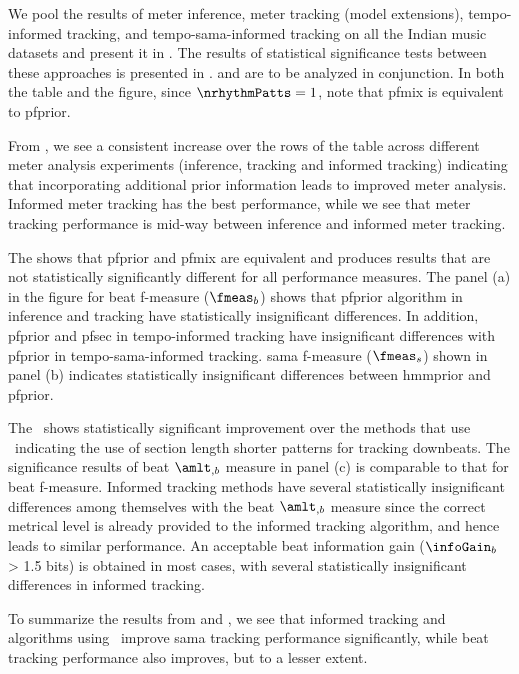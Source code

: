 We pool the results of meter inference, meter tracking (model extensions), tempo-informed tracking, and tempo-sama-informed tracking on all the Indian music datasets and present it in . The results of statistical significance tests between these approaches is presented in .  and  are to be analyzed in conjunction. In both the table and the figure, since $\nrhythmPatts=1$, note that \acrshort{pfmix} is equivalent to \acrshort{pfprior}. 

From , we see a consistent increase over the rows of the table across different meter analysis experiments (inference, tracking and informed tracking) indicating that incorporating additional prior information leads to improved meter analysis. Informed meter tracking has the best performance, while we see that meter tracking performance is mid-way between inference and informed meter tracking. 

The  shows that \acrshort{pfprior} and \acrshort{pfmix} are equivalent and produces results that are not statistically significantly different for all performance measures. The panel (a) in the figure for beat f-measure ($\fmeas_b$) shows that \acrshort{pfprior} algorithm in inference and tracking have statistically insignificant differences. In addition, \acrshort{pfprior} and \acrshort{pfsec} in tempo-informed tracking have insignificant differences with \acrshort{pfprior} in tempo-\gls{sama}-informed tracking. \Gls{sama} f-measure ($\fmeas_s$) shown in panel (b) indicates statistically insignificant differences between \acrshort{hmmprior} and \acrshort{pfprior}. 

The \spmodel\ shows statistically significant improvement over the methods that use \bpmodel\ indicating the use of section length shorter patterns for tracking downbeats. The significance results of beat $\amlt_{,b}$ measure in panel (c) is comparable to that for beat f-measure. Informed tracking methods have several statistically insignificant differences among themselves with the beat $\amlt_{,b}$ measure since the correct metrical level is already provided to the informed tracking algorithm, and hence leads to similar performance. An acceptable beat information gain ($\infoGain_b$ > 1.5 bits) is obtained in most cases, with several statistically insignificant differences in informed tracking. 

To summarize the results from  and , we see that informed tracking and algorithms using \spmodel\ improve \gls{sama} tracking performance significantly, while beat tracking performance also improves, but to a lesser extent. 

